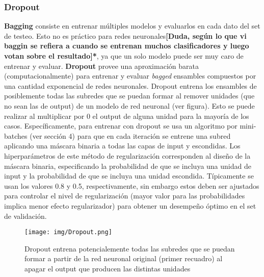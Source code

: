 \subsubsection{Dropout}

\textbf{Bagging} consiste en entrenar m\'ultiples modelos y evaluarlos en cada dato del set de testeo. Esto no es pr\'actico para redes neuronales\textbf{[Duda, según lo que vi baggin se refiera a cuando se entrenan muchos clasificadores y luego votan sobre el resultado]*}, ya que un solo modelo puede ser muy caro de entrenar y evaluar. \textbf{Dropout} provee una aproximaci\'on barata (computacionalmente) para entrenar y evaluar \textit{bagged} ensambles compuestos por una cantidad exponencial de redes neuronales. Dropout entrena los ensambles de posiblemente todas las subredes que se puedan formar al remover unidades (que no sean las de output) de un modelo de red neuronal (ver figura). Esto se puede realizar al multiplicar por 0 el output de alguna unidad para la mayor\'ia de los casos. Espec\'ificamente, para entrenar con dropout se usa un algoritmo por mini-batches (ver secci\'on 4) para que en cada iteraci\'on se entrene una subred aplicando una m\'ascara binaria a todas las capas de input y escondidas. Los hiperpar\'ametros de este m\'etodo de regularizaci\'on corresponden al dise{\~{n}}o de la m\'ascara binaria, especificando la probabilidad de que se incluya una unidad de input y la probabilidad de que se incluya una unidad escondida. T\'ipicamente se usan los valores 0.8 y 0.5, respectivamente, sin embargo estos deben ser ajustados para controlar el nivel de regularizaci\'on (mayor valor para las probabilidades implica menor efecto regularizador) para obtener un desempe{\~{n}}o \'optimo en el set de validaci\'on.

\begin{figure}[H]
\captionsetup{font=small,labelfont=small}
\caption{Dropout entrena potencialemente todas las subredes que se puedan formar a partir de la red neuronal original (primer recuadro) al apagar el output que producen las distintas unidades}
\centering
\texttt{[image: img/Dropout.png]}
\end{figure}

